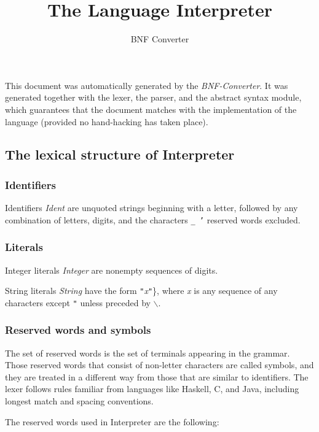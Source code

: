 \documentclass{article}
\title{The Language Interpreter}
\author{BNF Converter}
\begin{document}
\maketitle
\clearpage


This document was automatically generated by the \textit{BNF-Converter}. It was generated together with the lexer, the parser, and the abstract syntax module, which guarantees that the document matches with the implementation of the language (provided no hand-hacking has taken place).

\subsection*{The lexical structure of Interpreter}

\subsubsection*{Identifiers}

Identifiers \textit{Ident} are unquoted strings beginning with a letter,
followed by any combination of letters, digits, and the characters \texttt{\_ '}
reserved words excluded.

\subsubsection*{Literals}

Integer literals \textit{Integer} are nonempty sequences of digits.

String literals \textit{String} have the form
\texttt{"}\textit{x}\texttt{"}\}, where \textit{x} is any sequence of any characters
except \texttt{"} unless preceded by \texttt{$\backslash$}.

\subsubsection*{Reserved words and symbols}

The set of reserved words is the set of terminals appearing in the grammar. Those reserved words that consist of non-letter characters are called symbols, and they are treated in a different way from those that are similar to identifiers. The lexer follows rules familiar from languages like Haskell, C, and Java, including longest match and spacing conventions.

The reserved words used in Interpreter are the following:
\end{document}
